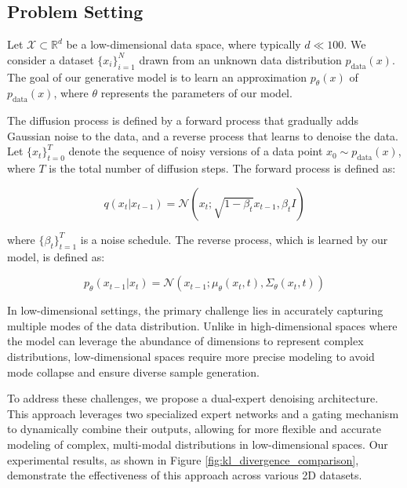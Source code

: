 \documentclass{article} %
\begin{document}
\subsection{Problem Setting}
Let $\mathcal{X} \subset \mathbb{R}^d$ be a low-dimensional data space, where typically $d \ll 100$. We consider a dataset $\{x_i\}_{i=1}^{N}$ drawn from an unknown data distribution $p_\text{data}(x)$. The goal of our generative model is to learn an approximation $p_\theta(x)$ of $p_\text{data}(x)$, where $\theta$ represents the parameters of our model.

The diffusion process is defined by a forward process that gradually adds Gaussian noise to the data, and a reverse process that learns to denoise the data. Let $\{x_t\}_{t=0}^{T}$ denote the sequence of noisy versions of a data point $x_0 \sim p_\text{data}(x)$, where $T$ is the total number of diffusion steps. The forward process is defined as:

\begin{equation}
    q(x_t | x_{t-1}) = \mathcal{N}(x_t; \sqrt{1 - \beta_t}x_{t-1}, \beta_t I)
\end{equation}

where $\{\beta_t\}_{t=1}^{T}$ is a noise schedule. The reverse process, which is learned by our model, is defined as:

\begin{equation}
    p_\theta(x_{t-1} | x_t) = \mathcal{N}(x_{t-1}; \mu_\theta(x_t, t), \Sigma_\theta(x_t, t))
\end{equation}

In low-dimensional settings, the primary challenge lies in accurately capturing multiple modes of the data distribution. Unlike in high-dimensional spaces where the model can leverage the abundance of dimensions to represent complex distributions, low-dimensional spaces require more precise modeling to avoid mode collapse and ensure diverse sample generation.

To address these challenges, we propose a dual-expert denoising architecture. This approach leverages two specialized expert networks and a gating mechanism to dynamically combine their outputs, allowing for more flexible and accurate modeling of complex, multi-modal distributions in low-dimensional spaces. Our experimental results, as shown in Figure \ref{fig:kl_divergence_comparison}, demonstrate the effectiveness of this approach across various 2D datasets.
\end{document}
